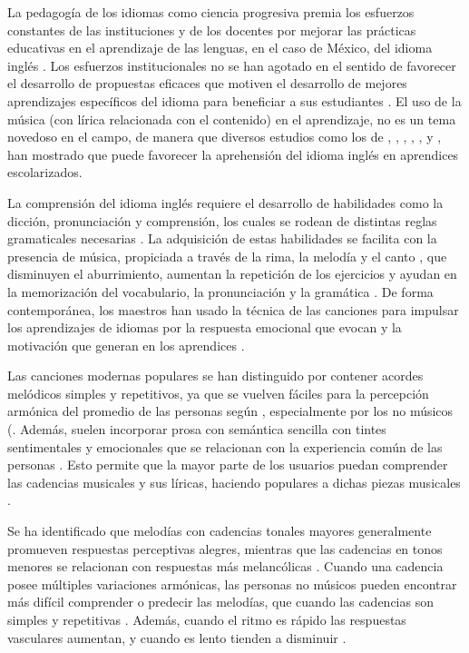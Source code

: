 \documentclass[spanish]{textolivre}
\begin{document}
La pedagogía de los idiomas como ciencia progresiva premia los esfuerzos constantes de las instituciones y de los docentes por mejorar las prácticas educativas en el aprendizaje de las lenguas, en el caso de México, del idioma inglés \cite{legacy2017dog}. Los esfuerzos institucionales no se han agotado en el sentido de favorecer el desarrollo de propuestas eficaces que motiven el desarrollo de mejores aprendizajes específicos del idioma para beneficiar a sus estudiantes \cite{vagh2009measuring}. El uso de la música (con lírica relacionada con el contenido) en el aprendizaje, no es un tema novedoso en el campo, de manera que diversos estudios como los de \textcite{moradi2014effect}, \cite{shehadejiman2016effectiveness}, \textcite{yusmita2017effects}, \cite{suwartono2019songs}, \cite{jabak2021role}, \textcite{saldiraner2021using} y \textcite{hakvoort2022music}, han mostrado que puede favorecer la aprehensión del idioma inglés en aprendices escolarizados.

La comprensión del idioma inglés requiere el desarrollo de habilidades como la dicción, pronunciación y comprensión, los cuales se rodean de distintas reglas gramaticales necesarias \cite{rauscher2016music}. La adquisición de estas habilidades se facilita con la presencia de música, propiciada a través de la rima, la melodía y el canto \cite{kafol2015analysis}, que disminuyen el aburrimiento, aumentan la repetición de los ejercicios y ayudan en la memorización del vocabulario, la pronunciación y la gramática \cite{shehadejiman2016effectiveness}. De forma contemporánea, los maestros han usado la técnica de las canciones para impulsar los aprendizajes de idiomas por la respuesta emocional que evocan y la motivación que generan en los aprendices \cite{brown2010arts}.

Las canciones modernas populares se han distinguido por contener acordes melódicos simples y repetitivos, ya que se vuelven fáciles para la percepción armónica del promedio de las personas según \textcite{chiang2018language}, especialmente por los no músicos \cite{harding2019cortical}(. Además, suelen incorporar prosa con semántica sencilla con tintes sentimentales y emocionales que se relacionan con la experiencia común de las personas \cite{talamini2018learning}. Esto permite que la mayor parte de los usuarios puedan comprender las cadencias musicales y sus líricas, haciendo populares a dichas piezas musicales \cite{kim2014melody}.

Se ha identificado que melodías con cadencias tonales mayores generalmente promueven respuestas perceptivas alegres, mientras que las cadencias en tonos menores se relacionan con respuestas más melancólicas \cite{jancke2010music, hallam2010effects}. Cuando una cadencia posee múltiples variaciones armónicas, las personas no músicos pueden encontrar más difícil comprender o predecir las melodías, que cuando las cadencias son simples y repetitivas \cite{zhang_background_2014, chiang2018language}. Además, cuando el ritmo es rápido las respuestas vasculares aumentan, y cuando es lento tienden a disminuir \cite{aljanaki2016studying}.
\end{document}
